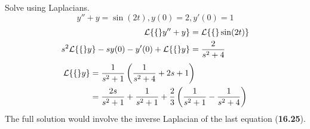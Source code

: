 \documentclass[diffeq.tex]{subfiles}
\begin{document}
    \np
    \begin{example}
        Solve using Laplacians.
        \begin{equation}
            y'' + y = \sin(2t), y(0) = 2, y'(0) = 1
        \end{equation}
        \begin{alignat}{1}
            \mathcal{L}\{\{\}y'' + y\} &= \mathcal{L}\{\{\}\sin(2t)\}\\
            s^2\mathcal{L}\{\{\}y\}-sy(0)-y'(0)+\mathcal{L}\{\{\}y\} &= \frac{2}{s^{2} + 4}
        \end{alignat}
        \begin{alignat}{1}
            \mathcal{L}\{\{\}y\} &= \frac{1}{s^{2} + 1}\left(\frac{1}{s^2 + 4} + 2s + 1\right)\\
            &= \frac{2s}{s^{2} + 1} + \frac{1}{s^{2} + 1} + \frac{2}{3}\left(\frac{1}{s^{2} + 1} - \frac{1}{s^{2} + 4}\right)
        \end{alignat}
        The full solution would involve the inverse Laplacian of the last equation (\textbf{16.25}).
    \end{example}
\end{document}
